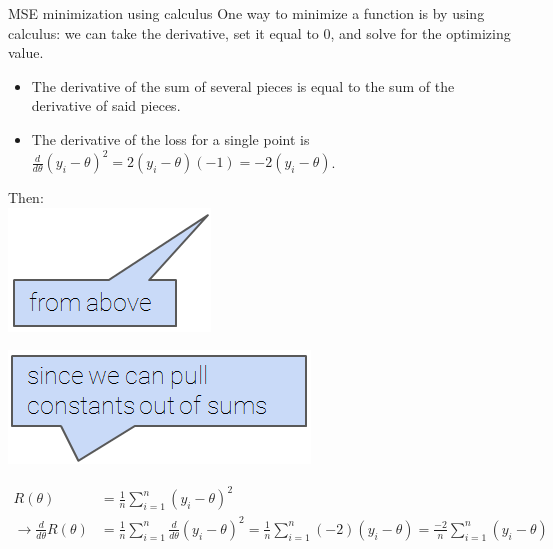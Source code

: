 \documentclass[aspectratio=169]{../latex_main/tntbeamer}  %
\begin{document}
	
	\begin{frame}{MSE minimization using calculus}
	    One way to minimize a function is by using calculus: we can take the derivative, set it equal to 0, and solve for the optimizing value.
	    \begin{itemize}
	        \item The derivative of the sum of several pieces is equal to the sum of the derivative of said pieces.
	        \item The derivative of the loss for a single point is    $\frac{d}{d\theta} (y_i - \theta)^2 = 2(y_i - \theta)(-1) = -2(y_i - \theta)$.                                
	    \end{itemize}
	    Then:\\
	    \vspace{2.5cm}
	    \hspace{6.5cm} \includegraphics[scale=.4]{Bild27}\\
	    \vspace{-2.5cm}
	    
	    \vspace{-.7cm}
	    \hspace{10.5cm} \includegraphics[scale=.4]{Bild28}\\
	    \vspace{0.7cm}
	    
	    \vspace{-3cm}
	    \begin{align*}
	        R(\theta) &= \frac{1}{n}\sum\limits_{i=1}^n(y_i - \theta)^2\\
	        \rightarrow \frac{d}{d\theta}R(\theta)  &= \frac{1}{n} \sum\limits_{i=1}^n\frac{d}{d\theta}(y_i -\theta)^2 = \frac{1}{n}\sum\limits_{i=1}^n(-2)(y_i - \theta) = \frac{-2}{n}\sum\limits_{i=1}^n(y_i - \theta)
	    \end{align*}
	\end{frame}
	
\end{document}
